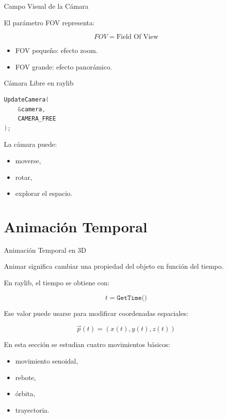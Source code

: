 \documentclass{beamer}
\begin{document}
\begin{frame}{Campo Visual de la Cámara}

El parámetro FOV representa:

$$
FOV = \text{Field Of View}
$$

\vspace{0.4cm}

\begin{itemize}
    \item FOV pequeño: efecto zoom.
    \item FOV grande: efecto panorámico.
\end{itemize}

\end{frame}

\begin{frame}[fragile]{Cámara Libre en raylib}

\begin{lstlisting}[language=C++]
UpdateCamera(
    &camera,
    CAMERA_FREE
);
\end{lstlisting}

\vspace{0.4cm}

La cámara puede:

\begin{itemize}
    \item moverse,
    \item rotar,
    \item explorar el espacio.
\end{itemize}

\end{frame}


\section{Animación Temporal}

\begin{frame}{Animación Temporal en 3D}

Animar significa cambiar una propiedad del objeto en función del tiempo.

\vspace{0.4cm}

En raylib, el tiempo se obtiene con:

$$
t = \texttt{GetTime()}
$$

\vspace{0.4cm}

Ese valor puede usarse para modificar coordenadas espaciales:

$$
\vec{p}(t) = (x(t),y(t),z(t))
$$

\vspace{0.4cm}

En esta sección se estudian cuatro movimientos básicos:

\begin{itemize}
    \item movimiento senoidal,
    \item rebote,
    \item órbita,
    \item trayectoria.
\end{itemize}

\end{frame}
\end{document}
